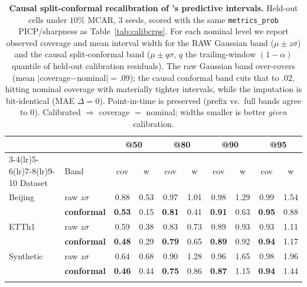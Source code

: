 \begin{table}[t]\centering\small
\setlength{\tabcolsep}{4pt}
\caption{\textbf{Causal split-conformal recalibration of \cafe{}'s predictive intervals.} Held-out cells under $10\%$ MCAR, 3 seeds, scored with the same \texttt{metrics\_prob} PICP/sharpness as Table~\ref{tab:calibcrps}. For each nominal level we report observed coverage and mean interval width for the RAW Gaussian band ($\mu\pm z\sigma$) and the causal split-conformal band ($\mu\pm q\sigma$, $q$ the trailing-window $(1{-}\alpha)$ quantile of held-out calibration residuals). The raw Gaussian band over-covers (mean $|$coverage$-$nominal$|=.09$); the causal conformal band cuts that to $.02$, hitting nominal coverage with materially tighter intervals, while the imputation is bit-identical (MAE $\Delta=0$). Point-in-time is preserved (prefix vs.\ full bands agree to $0$). Calibrated $\Rightarrow$ coverage $=$ nominal; widths smaller is better \emph{given} calibration.}
\label{tab:conformal}
\begin{tabular}{@{}llcccccccc@{}}
\toprule
& & \multicolumn{2}{c}{@50} & \multicolumn{2}{c}{@80} & \multicolumn{2}{c}{@90} & \multicolumn{2}{c}{@95} \\
\cmidrule(lr){3-4}\cmidrule(lr){5-6}\cmidrule(lr){7-8}\cmidrule(lr){9-10}
Dataset & Band & cov & w & cov & w & cov & w & cov & w \\
\midrule
Beijing & raw $z\sigma$ & 0.88 & 0.53 & 0.97 & 1.01 & 0.98 & 1.29 & 0.99 & 1.54 \\
& \textbf{conformal} & \textbf{0.53} & 0.15 & \textbf{0.81} & 0.41 & \textbf{0.91} & 0.63 & \textbf{0.95} & 0.88 \\
\addlinespace[2pt]
ETTh1 & raw $z\sigma$ & 0.59 & 0.38 & 0.83 & 0.73 & 0.89 & 0.93 & 0.93 & 1.11 \\
& \textbf{conformal} & \textbf{0.48} & 0.29 & \textbf{0.79} & 0.65 & \textbf{0.89} & 0.92 & \textbf{0.94} & 1.17 \\
\addlinespace[2pt]
Synthetic & raw $z\sigma$ & 0.64 & 0.68 & 0.90 & 1.28 & 0.96 & 1.65 & 0.98 & 1.96 \\
& \textbf{conformal} & \textbf{0.46} & 0.44 & \textbf{0.75} & 0.86 & \textbf{0.87} & 1.15 & \textbf{0.94} & 1.44 \\
\addlinespace[2pt]
\bottomrule
\end{tabular}
\end{table}
